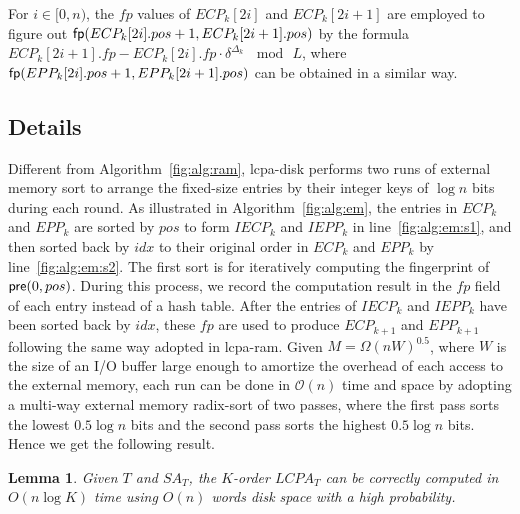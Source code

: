 \documentclass{llncs}
\newtheorem{Lemma}{Lemma}
\begin{document}
For $i\in [0,n)$, the $fp$ values of $ECP_k[2i]$ and $ECP_k[2i+1]$ are employed to figure out ${\sf fp}(ECP_k[2i].pos+1, ECP_k[2i+1].pos)$ by the formula $ECP_k[2i+1].fp - ECP_k[2i].fp \cdot \delta^{\Delta_k} \, \mod \, L$, where ${\sf fp}(EPP_k[2i].pos+1, EPP_k[2i+1].pos)$ can be obtained in a similar way.

\subsection{Details}
Different from Algorithm~\ref{fig:alg:ram}, lcpa-disk performs two runs of external memory sort to arrange the fixed-size entries by their integer keys of $\log n$ bits during each round. As illustrated in Algorithm~\ref{fig:alg:em}, the entries in $ECP_k$ and $EPP_k$ are sorted by $pos$ to form $IECP_k$ and $IEPP_k$ in line~\ref{fig:alg:em:s1}, and then sorted back by $idx$ to their original order in $ECP_k$ and $EPP_k$ by line~\ref{fig:alg:em:s2}. The first sort is for iteratively computing the fingerprint of ${\sf pre}(0,pos)$. During this process, we record the computation result in the $fp$ field of each entry instead of a hash table. After the entries of $IECP_k$ and $IEPP_k$ have been sorted back by $idx$, these $fp$ are used to produce $ECP_{k+1}$ and $EPP_{k+1}$ following the same way adopted in lcpa-ram. Given $M=\Omega(nW)^{0.5}$, where $W$ is the size of an I/O buffer large enough to amortize the overhead of each access to the external memory, each run can be done in $\mathcal{O}(n)$ time and space by adopting a multi-way external memory radix-sort of two passes, where the first pass sorts the lowest $0.5\log n$ bits and the second pass sorts the highest $0.5\log n$ bits. Hence we get the following result.

\begin{Lemma}
\label{thm:lcp:em}
Given $T$ and $SA_T$, the $K$-order $LCPA_T$ can be correctly computed in $O(n \log K)$ time using $O(n)$ words disk space with a high probability.
\end{Lemma}
\end{document}
